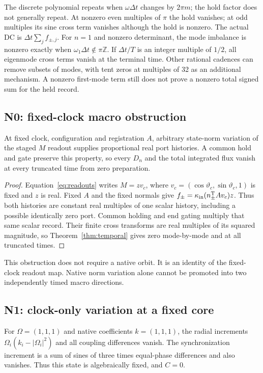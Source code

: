 The discrete polynomial repeats when $\omega\Delta t$ changes by $2\pi m$; the hold factor does not generally repeat. At nonzero even multiples of $\pi$ the hold vanishes; at odd multiples its sine cross term vanishes although the hold is nonzero. The actual DC is $\Delta t\sum_j f_{\pm,j}$. For $n=1$ and nonzero determinant, the mode imbalance is nonzero exactly when $\omega_1\Delta t\notin\pi\mathbb Z$. If $\Delta t/T$ is an integer multiple of $1/2$, all eigenmode cross terms vanish at the terminal time. Other rational cadences can remove subsets of modes, with tent zeros at multiples of 32 as an additional mechanism. A nonzero first-mode term still does not prove a nonzero total signed sum for the held record.

\subsection{N0: fixed-clock macro obstruction}
\begin{proposition}\label{prop:N0}
At fixed clock, configuration and registration $A$, arbitrary state-norm variation of the staged $M$ readout supplies proportional real port histories. A common hold and gate preserve this property, so every $D_n$ and the total integrated flux vanish at every truncated time from zero preparation.
\end{proposition}
\begin{proof}
Equation~\eqref{eq:readouts} writes $M=zv_c$, where $v_c=(\cos\vartheta_c,\sin\vartheta_c,1)$ is fixed and $z$ is real. Fixed $A$ and the fixed normals give $f_\pm=\kappa_{\rm in}(n_\pm^{\mathrm T} Av_c)z$. Thus both histories are constant real multiples of one scalar history, including a possible identically zero port. Common holding and end gating multiply that same scalar record. Their finite cross transforms are real multiples of its squared magnitude, so Theorem~\ref{thm:temporal} gives zero mode-by-mode and at all truncated times.
\end{proof}
This obstruction does not require a native orbit. It is an identity of the fixed-clock readout map. Native norm variation alone cannot be promoted into two independently timed macro directions.

\subsection{N1: clock-only variation at a fixed core}
For $\Omega=(1,1,1)$ and native coefficients $k=(1,1,1)$, the radial increments $\Omega_i(k_i-|\Omega_i|^2)$ and all coupling differences vanish. The synchronization increment is a sum of sines of three times equal-phase differences and also vanishes. Thus this state is algebraically fixed, and $C=0$.


